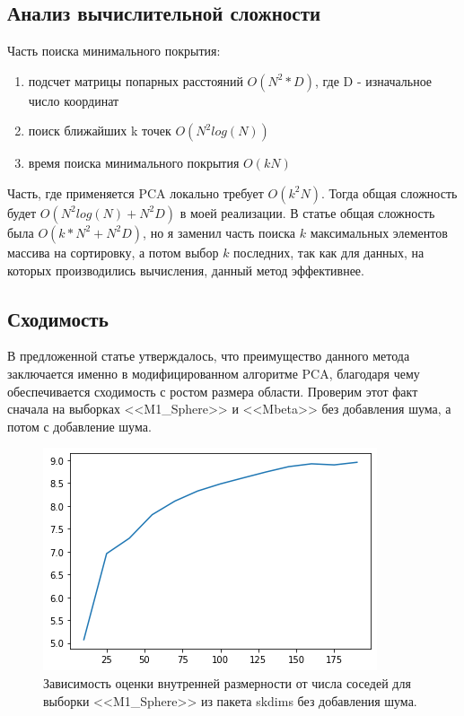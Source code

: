 \documentclass[english, russian]{sobraep}
\begin{document}
\subsection{Анализ вычислительной сложности}
Часть поиска минимального покрытия:
    \begin{enumerate}
        \item подсчет матрицы попарных расстояний $O(N^2*D)$, где D - изначальное число координат
        \item поиск ближайших k точек $O(N^2log(N))$
        \item время поиска минимального покрытия $O(kN)$
    \end{enumerate}
Часть, где применяется PCA локально требует $O(k^2N)$. Тогда общая сложность будет $O(N^2log(N) + N^2D)$ в моей реализации. В статье общая сложность была $O(k * N^2 + N^2D)$, но я заменил часть поиска $k$ максимальных элементов массива на сортировку, а потом выбор $k$ последних, так как для данных, на которых производились вычисления, данный метод эффективнее.

\subsection{Сходимость}
В предложенной статье утверждалось, что преимущество данного метода заключается именно в модифицированном алгоритме PCA, благодаря чему обеспечивается сходимость с ростом размера области. Проверим этот факт сначала на выборках <<M1\_Sphere>> и <<Mbeta>> без добавления шума, а потом с добавление шума.

\begin{figure}[H]
    \includegraphics[scale=0.5]{gr1.png}
    \centering
    \caption{Зависимость оценки внутренней размерности от числа соседей для выборки <<M1\_Sphere>> из пакета skdims без добавления шума.}
    \label{fig:fig1}
\end{figure}
\end{document}
